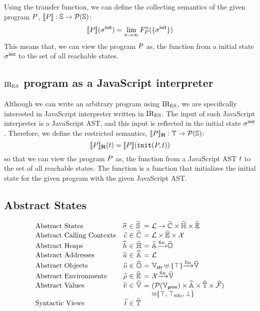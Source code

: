 Using the transfer function, we can define the collecting semantics of the given program $P$,
$\llbracket{P}\rrbracket: \mathbb{S} \rightarrow \mathcal{P}(\mathbb{S})$:
\[
  \llbracket{P}\rrbracket(\sigma^{\textsf{init}}) = \lim_{n \rightarrow \infty}F_{P}^n( \{ \sigma^{\textsf{init}} \} ) \\
\]
This means that, we can view the program $P$ as, the function from a initial state
$\sigma^{\textsf{init}}$ to the set of all reachable states.

\subsection{$\text{IR}_\text{ES}$ program as a JavaScript interpreter}
Although we can write an arbitrary program using $\text{IR}_\text{ES}$, we are specifically interested in
JavaScript interpreter written in $\text{IR}_\text{ES}$. The input of such JavaScript interpreter is a JavaScript AST,
and this input is reflected in the initial state $\sigma^{\textsf{init}}$.
Therefore, we define the restricted semantics,
$\llbracket{P}\rrbracket_\textbf{R}: \mathbb{T} \rightarrow \mathcal{P}(\mathbb{S})$:
\[
  \rsem{\prog}(\tree) = \sem{\prog}( \getinitst(\prog, \tree) ) \\
\]
so that we can view the program $P$ as, the function from a JavaScript AST
$t$ to the set of all reachable states. The \getinitst function is a function
that initializes the initial state for the given program with the given JavaScript AST.

\subsection{Abstract States}
\[
  \begin{array}{lr@{~}c@{~}l@{~}c@{~}l}
    \text{Abstract States} & \astate &\in& \astset &=&
    \labset \rightarrow \actxtset \times \aheapset \times \aenvset\\

    \text{Abstract Calling Contexts} & \actxt &\in& \actxtset &=&
    \labset \times \aenvset \times \varset\\

    \text{Abstract Heaps} & \aheap &\in& \aheapset &=&
    \aaddrset \finmap \aobjset\\

    \text{Abstract Addresses} & \aaddr &\in& \aaddrset &=&
    \labset\\

    \text{Abstract Objects} & \aobj &\in& \aobjset &=&
    \strset \uplus \{ \top \} \finmap \avalset\\

    \text{Abstract Environments} & \aenv &\in& \aenvset &=&
    \varset \finmap \avalset\\

    \text{Abstract Values} & \aval &\in& \avalset &=&
    (\powerset{\pvalset} \times \aaddrset \times \atreeset \times \afuncset)\\
    &&&&&\uplus \{ \top, \sdotop, \bot \}\\

    \text{Syntactic Views} & \atree &\in& \atreeset\\
  \end{array}
\]

